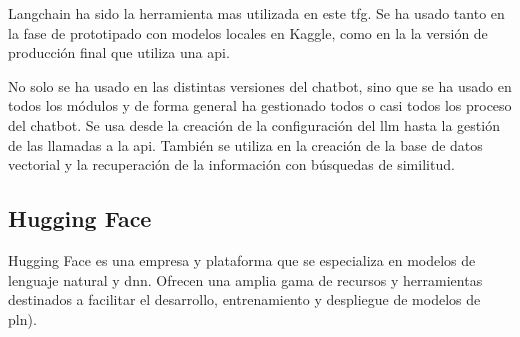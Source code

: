 Langchain ha sido la herramienta mas utilizada en este \acrshort{tfg}. Se ha usado tanto en la fase de prototipado con modelos locales en Kaggle, como en la la versión de producción final que utiliza una \acrshort{api}. 

No solo se ha usado en las distintas versiones del chatbot, sino que se ha usado en todos los módulos y de forma general ha gestionado todos o casi todos los proceso del chatbot. Se usa desde la creación de la configuración del \acrshort{llm} hasta la gestión de las llamadas a la \acrshort{api}. También se utiliza en la creación de la base de datos vectorial y la recuperación de la información con búsquedas de similitud.

\subsection{Hugging Face}

Hugging Face es una empresa y plataforma que se especializa en modelos de lenguaje natural y \acrlong{dnn}. Ofrecen una amplia gama de recursos y herramientas destinados a facilitar el desarrollo, entrenamiento y despliegue de modelos de \acrfull{pln}).

